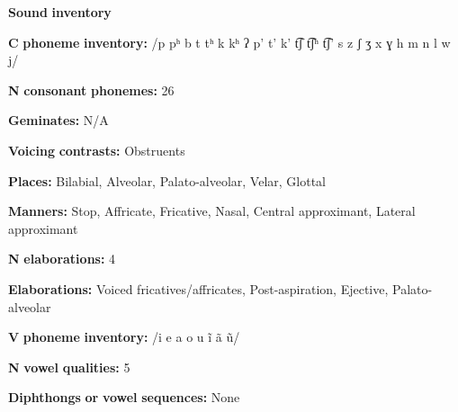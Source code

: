 \begin{styleBody}
\textbf{Sound} \textbf{inventory}
\end{styleBody}

\begin{styleBody}
\textbf{C} \textbf{phoneme} \textbf{inventory:} /p pʰ b t tʰ k kʰ ʔ p’ t’ k’ t͡ʃ t͡ʃʰ t͡ʃ’ s z ʃ ʒ x ɣ h m n l w j/
\end{styleBody}

\begin{styleBody}
\textbf{N} \textbf{consonant} \textbf{phonemes:} 26
\end{styleBody}

\begin{styleBody}
\textbf{Geminates:} N/A
\end{styleBody}

\begin{styleBody}
\textbf{Voicing} \textbf{contrasts:} Obstruents
\end{styleBody}

\begin{styleBody}
\textbf{Places:} Bilabial, Alveolar, Palato-alveolar, Velar, Glottal
\end{styleBody}

\begin{styleBody}
\textbf{Manners:} Stop, Affricate, Fricative, Nasal, Central approximant, Lateral approximant
\end{styleBody}

\begin{styleBody}
\textbf{N} \textbf{elaborations:} 4
\end{styleBody}

\begin{styleBody}
\textbf{Elaborations:} Voiced fricatives/affricates, Post-aspiration, Ejective, Palato-alveolar
\end{styleBody}

\begin{styleBody}
\textbf{V} \textbf{phoneme} \textbf{inventory:} /i e a o u ĩ ã ũ/
\end{styleBody}

\begin{styleBody}
\textbf{N} \textbf{vowel} \textbf{qualities:} 5
\end{styleBody}

\begin{styleBody}
\textbf{Diphthongs} \textbf{or} \textbf{vowel} \textbf{sequences:} None
\end{styleBody}

